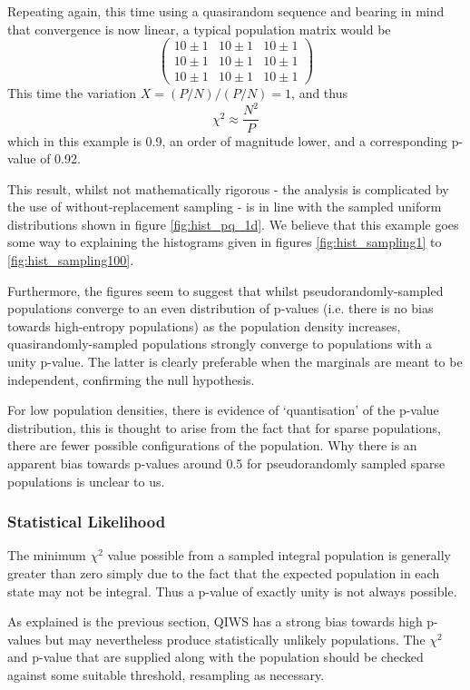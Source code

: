 \documentclass{JASSS}
\begin{document}
Repeating again, this time using a quasirandom sequence and bearing in mind that convergence is now linear, a typical population matrix would be 
\[\left( \begin{array}{ccc}
10\pm1 & 10\pm1 & 10\pm1 \\
10\pm1 & 10\pm1 & 10\pm1 \\
10\pm1 & 10\pm1 & 10\pm1 \end{array} \right)\]
This time the variation \(X=(P/N)/(P/N)=1\), and thus
\begin{equation}
\chi^2 \approx \frac{N^2}{P}
\end{equation}
which in this example is 0.9, an order of magnitude lower, and a corresponding p-value of 0.92.

This result, whilst not mathematically rigorous - the analysis is complicated by the use of without-replacement sampling - is in line with the sampled uniform distributions shown in figure \ref{fig:hist_pq_1d}. We believe that this example goes some way to explaining the histograms given in figures \ref{fig:hist_sampling1} to \ref{fig:hist_sampling100}.

Furthermore, the figures seem to suggest that whilst pseudorandomly-sampled populations converge to an even distribution of p-values (i.e. there is no bias towards high-entropy populations) as the population density increases, quasirandomly-sampled populations strongly converge to populations with a unity p-value. The latter is clearly preferable when the marginals are meant to be independent, confirming the null hypothesis.

For low population densities, there is evidence of `quantisation' of the p-value distribution, this is thought to arise from the fact that for sparse populations, there are fewer possible configurations of the population. Why there is an apparent bias towards p-values around 0.5 for pseudorandomly sampled sparse populations is unclear to us.

\subsubsection{Statistical Likelihood}\label{degeneracy}

The minimum \(\chi^2\) value possible from a sampled integral population is generally greater than zero simply due to the fact that the expected population in each state may not be integral. Thus a p-value of exactly unity is not always possible.

As explained is the previous section, QIWS has a strong bias towards high p-values but may nevertheless produce statistically unlikely populations. The \(\chi^2\) and p-value that are supplied along with the population should be checked against some suitable threshold, resampling as necessary.
\end{document}
